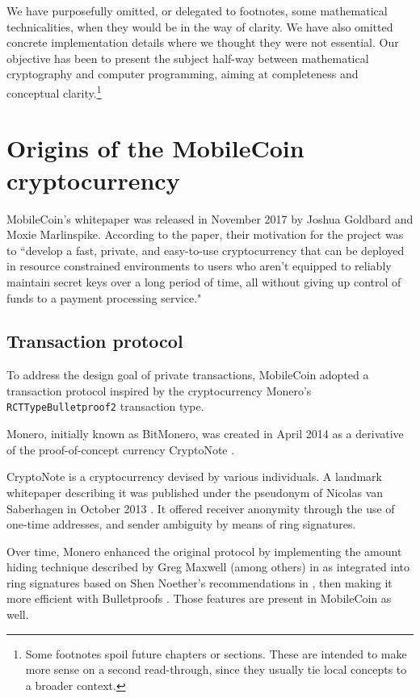 We have purposefully omitted, or delegated to footnotes, some mathematical technicalities, when they would be in the way of clarity. We have also omitted concrete implementation details where we thought they were not essential. Our objective has been to present the subject half-way between mathematical cryptography and computer programming, aiming at completeness and conceptual clarity.\footnote{Some footnotes spoil future chapters or sections. These are intended to make more sense on a second read-through, since they usually tie local concepts to a broader context.}



\section{Origins of the MobileCoin cryptocurrency}

MobileCoin's whitepaper was released in November 2017 by Joshua Goldbard and Moxie Marlinspike. According to the paper, their motivation for the project was to ``develop a fast, private, and easy-to-use cryptocurrency that can be deployed in resource constrained environments to users who aren't equipped to reliably maintain secret keys over a long period of time, all without giving up control of funds to a payment processing service." \cite{mobilecoin-whitepaper}%

\subsection{Transaction protocol}
\label{subsec:origins-tx-protocol}

To address the design goal of private transactions, MobileCoin adopted a transaction protocol inspired by the cryptocurrency Monero's {\tt RCTTypeBulletproof2} transaction type.

Monero, initially known as BitMonero, was created in April 2014 as a derivative of the proof-of-concept currency CryptoNote \cite{bitmonero-launched}.

CryptoNote is a cryptocurrency devised by various individuals. A landmark whitepaper describing it was published under the pseudonym of Nicolas van Saberhagen in October 2013 \cite{cryptoNoteWhitePaper}. It offered receiver anonymity through the use of one-time addresses, and sender ambiguity by means of ring signatures.

Over time, Monero enhanced the original protocol by implementing the amount hiding technique described by Greg Maxwell (among others) in \cite{Signatures2015BorromeanRS} as integrated into ring signatures based on Shen Noether's recommendations in \cite{MRL-0005-ringct}, then making it more efficient with Bulletproofs \cite{Bulletproofs_paper}. Those features are present in MobileCoin as well.


